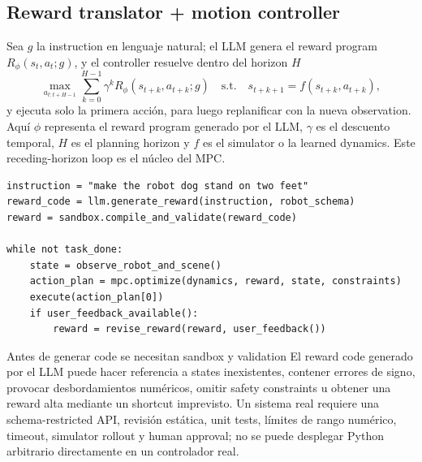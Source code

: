 \subsection{Reward translator + motion controller}

Sea $g$ la instruction en lenguaje natural; el LLM genera el reward program $R_\phi(s_t,a_t;g)$, y el controller resuelve dentro del horizon $H$
$$
\max_{a_{t:t+H-1}}
\sum_{k=0}^{H-1}\gamma^k R_\phi(s_{t+k},a_{t+k};g)
\quad\text{s.t.}\quad
s_{t+k+1}=f(s_{t+k},a_{t+k}),
$$
y ejecuta solo la primera acción, para luego replanificar con la nueva observation. Aquí $\phi$ representa el reward program generado por el LLM, $\gamma$ es el descuento temporal, $H$ es el planning horizon y $f$ es el simulator o la learned dynamics. Este receding-horizon loop es el núcleo del MPC.



\begin{lstlisting}[caption={Pseudocódigo conceptual del reward program y del ciclo de ejecución del MPC}]
instruction = "make the robot dog stand on two feet"
reward_code = llm.generate_reward(instruction, robot_schema)
reward = sandbox.compile_and_validate(reward_code)

while not task_done:
    state = observe_robot_and_scene()
    action_plan = mpc.optimize(dynamics, reward, state, constraints)
    execute(action_plan[0])
    if user_feedback_available():
        reward = revise_reward(reward, user_feedback())
\end{lstlisting}

\begin{warningbox}{Antes de generar code se necesitan sandbox y validation}
El reward code generado por el LLM puede hacer referencia a states inexistentes, contener errores de signo, provocar desbordamientos numéricos, omitir safety constraints u obtener una reward alta mediante un shortcut imprevisto. Un sistema real requiere una schema-restricted API, revisión estática, unit tests, límites de rango numérico, timeout, simulator rollout y human approval; no se puede desplegar Python arbitrario directamente en un controlador real.
\end{warningbox}

